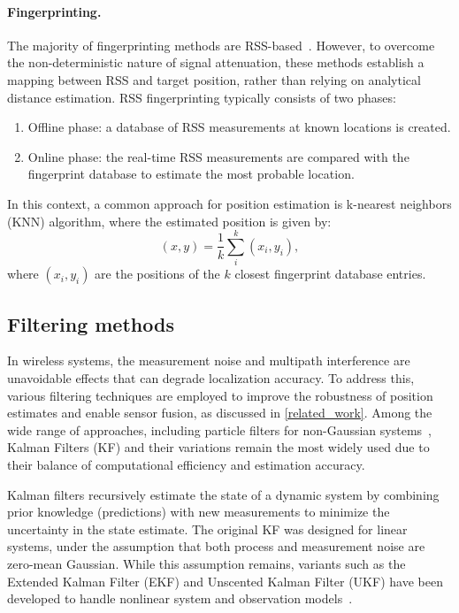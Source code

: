 \paragraph{Fingerprinting.}
The majority of fingerprinting methods are RSS-based~\cite{alarifi2016ultra}. However, to overcome the non-deterministic nature of signal attenuation, these methods establish a mapping between RSS and target position, rather than relying on analytical distance estimation. RSS fingerprinting typically consists of two phases:
\begin{enumerate}
    \item Offline phase: a database of RSS measurements at known locations is created.
    \item Online phase: the real-time RSS measurements are compared with the fingerprint database to estimate the most probable location.
\end{enumerate}
In this context, a common approach for position estimation is k-nearest neighbors (KNN) algorithm, where the estimated position is given by:
\begin{equation}
(x, y) = \frac{1}{k} \sum_{i}^{k} (x_i, y_i),
\end{equation}
where $(x_i, y_i)$ are the positions of the $k$ closest fingerprint database entries.

\subsection{Filtering methods}\label{kalman_theory}
In wireless systems, the measurement noise and multipath interference are unavoidable effects that can degrade localization accuracy. To address this, various filtering techniques are employed to improve the robustness of position estimates and enable sensor fusion, as discussed in \autoref{related_work}. Among the wide range of approaches, including particle filters for non-Gaussian systems~\cite{wang2014particle}, Kalman Filters (KF) and their variations remain the most widely used due to their balance of computational efficiency and estimation accuracy.

Kalman filters recursively estimate the state of a dynamic system by combining prior knowledge (predictions) with new measurements to minimize the uncertainty in the state estimate. The original KF was designed for linear systems, under the assumption that both process and measurement noise are zero-mean Gaussian. While this assumption remains, variants such as the Extended Kalman Filter (EKF) and Unscented Kalman Filter (UKF) have been developed to handle nonlinear system and observation models~\cite{wan2000unscented}.

